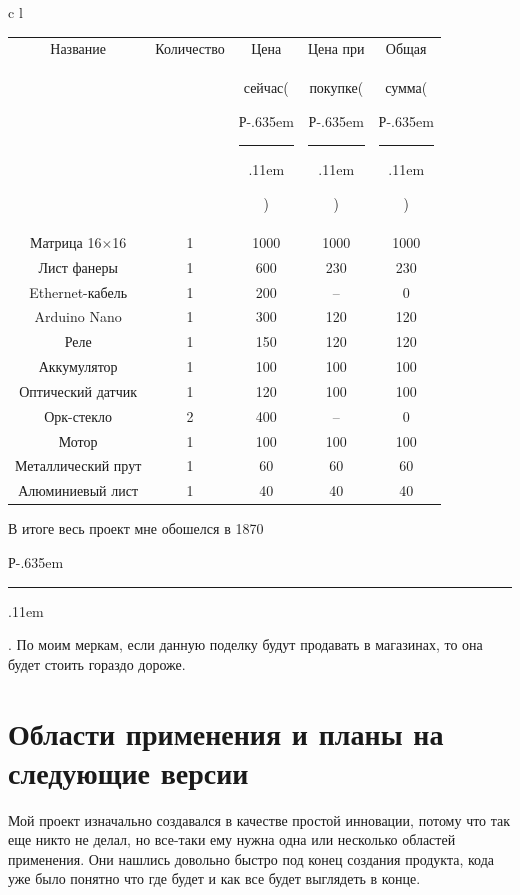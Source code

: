 \documentclass[a4paper, 12pt]{article}
\newcommand{\rub}{{\rm{Р}\kern-.635em\rule[.5ex]{.52em}{.04em}\kern.11em}}
\begin{document}
\begin{tabular}{c l}
\begin{center}
  \begin{tabular}{|c|c|c|c|c|}
    \hline
    Название             & Количество & Цена         & Цена при      & Общая       \\
                         &            & сейчас(\rub) & покупке(\rub) & сумма(\rub) \\
    \hline
    Матрица 16$\times$16 & 1          & 1000         & 1000          & 1000        \\
    \hline
    Лист фанеры          & 1          & 600          & 230           & 230         \\
    \hline
    Ethernet-кабель      & 1          & 200          & --            & 0           \\
    \hline
    Arduino Nano         & 1          & 300          & 120           & 120         \\
    \hline
    Реле                 & 1          & 150          & 120           & 120         \\
    \hline
    Аккумулятор          & 1          & 100          & 100           & 100         \\
    \hline
    Оптический датчик    & 1          & 120          & 100           & 100         \\
    \hline
    Орк-стекло           & 2          & 400          & --            & 0           \\
    \hline
    Мотор                & 1          & 100          & 100           & 100         \\
    \hline
    Металлический прут   & 1          & 60           & 60            & 60          \\
    \hline
    Алюминиевый лист     & 1          & 40           & 40            & 40          \\
    \hline
  \end{tabular}
\end{center}
В итоге весь проект мне обошелся в 1870\rub. По моим меркам, если данную поделку будут продавать в магазинах, то она будет стоить гораздо дороже.
\newpage
\section{Области применения и планы на следующие версии}

Мой проект изначально создавался в качестве простой инновации, потому
что так еще никто не делал, но все-таки ему нужна одна или несколько
областей применения. Они нашлись довольно быстро под конец создания
продукта, кода уже было понятно что где будет и как все будет
выглядеть в конце.


\end{tabular}
\end{document}
